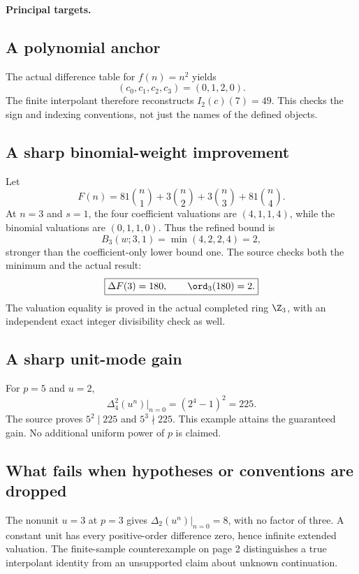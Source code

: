 \textbf{Principal targets.}\par
{}\par
{}\par
{}
\par\medskip
{}
\subsection*{A polynomial anchor}
The actual difference table for $f(n)=n^2$ yields
\[
 (c_0,c_1,c_2,c_3)=(0,1,2,0).
\]
The finite interpolant therefore reconstructs $I_2(c)(7)=49$. This checks the sign and indexing conventions, not just the names of the defined objects.

\subsection*{A sharp binomial-weight improvement}
Let
\[
 F(n)=81\binom n1+3\binom n2+3\binom n3+81\binom n4.
\]
At $n=3$ and $s=1$, the four coefficient valuations are $(4,1,1,4)$, while the binomial valuations are $(0,1,1,0)$. Thus the refined bound is
\[
 B_3(w;3,1)=\min(4,2,2,4)=2,
\]
stronger than the coefficient-only lower bound one. The source checks both the minimum and the actual result:
\[
 \boxed{\Delta F(3)=180,\qquad\ord_3(180)=2.}
\]
The valuation equality is proved in the actual completed ring $\Z_3$, with an independent exact integer divisibility check as well.

\subsection*{A sharp unit-mode gain}
For $p=5$ and $u=2$,
\[
 \Delta_4^2(u^n)\big|_{n=0}=(2^4-1)^2=225.
\]
The source proves $5^2\mid225$ and $5^3\nmid225$. This example attains the guaranteed gain. No additional uniform power of $p$ is claimed.

\subsection*{What fails when hypotheses or conventions are dropped}
The nonunit $u=3$ at $p=3$ gives $\Delta_2(u^n)|_{n=0}=8$, with no factor of three. A constant unit has every positive-order difference zero, hence infinite extended valuation. The finite-sample counterexample on page 2 distinguishes a true interpolant identity from an unsupported claim about unknown continuation.

